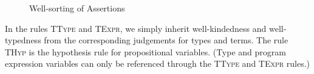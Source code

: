 \begin{figure}
\caption{Well-sorting of Assertions}
\label{logic-prop-ok}
\end{figure}

In the rules \textsc{TType} and \textsc{TExpr}, we simply
inherit well-kindedness and well-typedness from the corresponding
judgements for types and terms.  The rule \textsc{THyp} is the
hypothesis rule for propositional variables. (Type and program
expression variables can only be referenced through the
\textsc{TType} and \textsc{TExpr} rules.)


